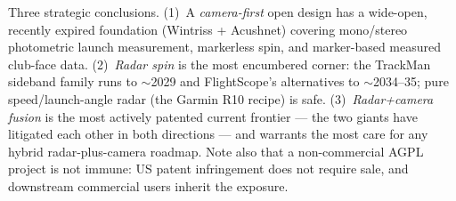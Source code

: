 \begin{keypoint}
Three strategic conclusions. (1)~A \emph{camera-first} open design has a
wide-open, recently expired foundation (Wintriss + Acushnet) covering
mono/stereo photometric launch measurement, markerless spin, and
marker-based measured club-face data. (2)~\emph{Radar spin} is the most
encumbered corner: the TrackMan sideband family runs to $\sim$2029 and
FlightScope's alternatives to $\sim$2034--35; pure speed/launch-angle
radar (the Garmin R10 recipe) is safe. (3)~\emph{Radar+camera fusion} is
the most actively patented current frontier --- the two giants have
litigated each other in both directions --- and warrants the most care
for any hybrid radar-plus-camera roadmap. Note also that a non-commercial
AGPL project is not immune: US patent infringement does not require
sale, and downstream commercial users inherit the exposure.
\end{keypoint}
